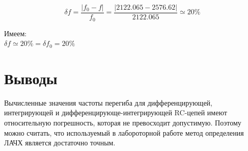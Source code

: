 \begin{equation}
\delta f = \frac{|f_0 - f|}{f_0} = \frac{|2122.065 - 2576.62|}{2122.065} \simeq 20 \% 
\end{equation}

Имеем:\\
$\delta f \simeq 20 \% = \delta f_0 = 20\%$
  
\section{Выводы}
Вычисленные значения частоты перегиба для дифференцирующей, интегрирующей и дифференцирующе-интегрирующей RC-цепей имеют относительную погрешность, которая не превосходит допустимую. Поэтому можно считать, что используемый в лабороторной работе метод определения ЛАЧХ является достаточно точным.

